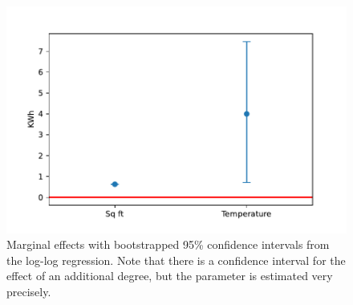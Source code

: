 \documentclass{article}
\begin{document}
\begin{figure}[h]
    \centering
    \includegraphics[scale=0.7]{mfx.pdf}
    \caption{Marginal effects with bootstrapped 95\% confidence intervals from the log-log regression.  Note that there is a confidence interval for the effect of an additional degree, but the parameter is estimated very precisely.}
    \label{fig:mfx}
\end{figure}
\end{document}
